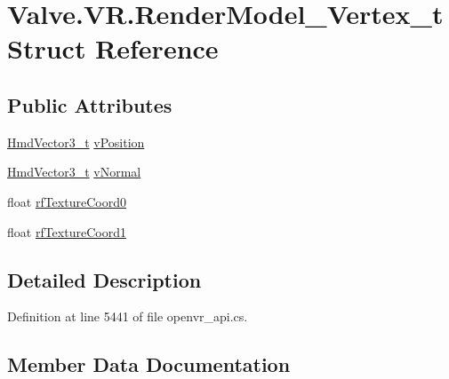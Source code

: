 \hypertarget{struct_valve_1_1_v_r_1_1_render_model___vertex__t}{}\section{Valve.\+V\+R.\+Render\+Model\+\_\+\+Vertex\+\_\+t Struct Reference}
\label{struct_valve_1_1_v_r_1_1_render_model___vertex__t}
\subsection*{Public Attributes}
\begin{DoxyCompactItemize}
\item 
\mbox{\hyperlink{struct_valve_1_1_v_r_1_1_hmd_vector3__t}{Hmd\+Vector3\+\_\+t}} \mbox{\hyperlink{struct_valve_1_1_v_r_1_1_render_model___vertex__t_ad8e1a4da1ab8591a966d0c6540526e48}{v\+Position}}
\item 
\mbox{\hyperlink{struct_valve_1_1_v_r_1_1_hmd_vector3__t}{Hmd\+Vector3\+\_\+t}} \mbox{\hyperlink{struct_valve_1_1_v_r_1_1_render_model___vertex__t_a7f02a2a1f77e878f9921d6546e727969}{v\+Normal}}
\item 
float \mbox{\hyperlink{struct_valve_1_1_v_r_1_1_render_model___vertex__t_a6136b295f4a22336228b333f42d57511}{rf\+Texture\+Coord0}}
\item 
float \mbox{\hyperlink{struct_valve_1_1_v_r_1_1_render_model___vertex__t_add523f344dfdaf24adb6b781c455f888}{rf\+Texture\+Coord1}}
\end{DoxyCompactItemize}


\subsection{Detailed Description}


Definition at line 5441 of file openvr\+\_\+api.\+cs.



\subsection{Member Data Documentation}
\mbox{\label{struct_valve_1_1_v_r_1_1_render_model___vertex__t_a6136b295f4a22336228b333f42d57511}} 
